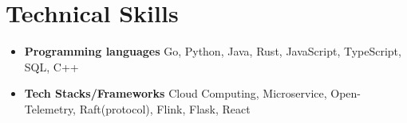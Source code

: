 \documentclass[a4,12pt]{article}
\newenvironment{zitemize}{
\begin{itemize}\itemsep0pt \parskip0pt \parsep1pt}
{\end{itemize}\vspace{-0.5cm}}
\begin{document}
\vspace{-0.4cm}
\section{\textbf{Technical Skills}}
\vspace{-0.2cm}
\begin{zitemize}
    \item \textbf{Programming languages} Go, Python, Java, Rust, JavaScript, TypeScript, SQL, C++
    \item \textbf{Tech Stacks/Frameworks} Cloud Computing, Microservice, Open-Telemetry, Raft(protocol), Flink, Flask, React
\end{zitemize}
\end{document}
